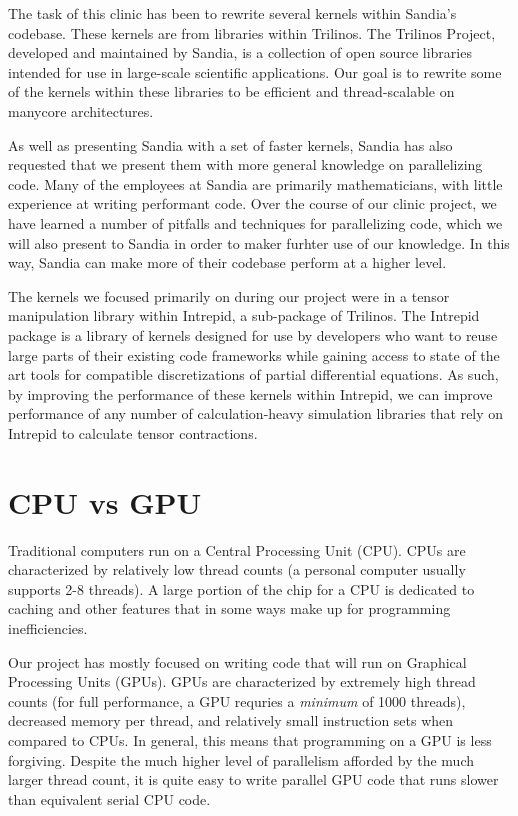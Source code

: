 The task of this clinic has been to rewrite several kernels within Sandia's codebase. These kernels are from libraries within
Trilinos. The Trilinos Project, developed and maintained by
Sandia, is a collection of open source libraries intended for use in large-scale
scientific applications. Our goal is to rewrite some of the kernels within these libraries to be 
efficient and thread-scalable on manycore architectures.

As well as presenting Sandia with a set of faster kernels, Sandia has also requested that we present them with more general 
knowledge on parallelizing code. Many of the employees at Sandia are primarily mathematicians, with little experience at 
writing performant code. Over the course of our clinic project, we have learned a number of pitfalls and techniques for 
parallelizing code, which we will also present to Sandia in order to maker furhter use of our knowledge. In this way, 
Sandia can make more of their codebase perform at a higher level.

The kernels we focused primarily on during our project were in a tensor manipulation library within Intrepid, 
a sub-package of Trilinos. 
The Intrepid package is a library of kernels designed for use by developers who want to reuse large
parts of their existing code frameworks while gaining access to state of the art
tools for compatible discretizations of partial differential equations. As such, by improving the 
performance of these kernels within Intrepid, we can improve performance
of any number of calculation-heavy simulation libraries that rely on Intrepid to calculate tensor contractions.


\section{CPU vs GPU} \label{CPU-GPU}

Traditional computers run on a Central Processing Unit (CPU). CPUs are characterized by relatively low thread
counts (a personal computer usually supports 2-8 threads). A large portion of the chip for a CPU is dedicated 
to caching and other features that in some ways make up for programming inefficiencies.

Our project has mostly focused on writing code that will run on Graphical Processing Units (GPUs).
GPUs are characterized by extremely high thread counts (for full performance, a GPU requries a \emph{minimum} of 1000 threads),
decreased memory per thread, and relatively small instruction sets when compared to CPUs. In general, this means 
that programming on a GPU is less forgiving. Despite the much higher level of parallelism afforded 
by the much larger thread count, it is quite easy to write parallel GPU code that runs slower than equivalent 
serial CPU code.

